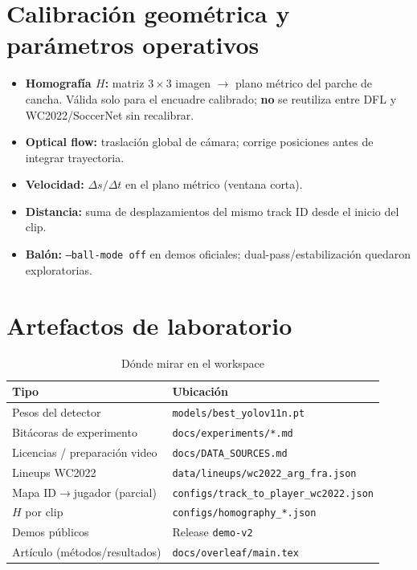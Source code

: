\documentclass[11pt,a4paper]{article}
\begin{document}
\section{Calibración geométrica y parámetros operativos}
\label{sec:geo}

\begin{itemize}[leftmargin=*,itemsep=3pt]
  \item \textbf{Homografía $H$:} matriz $3{\times}3$ imagen $\rightarrow$ plano métrico del parche de cancha. Válida solo para el encuadre calibrado; \textbf{no} se reutiliza entre DFL y WC2022/SoccerNet sin recalibrar.
  \item \textbf{Optical flow:} traslación global de cámara; corrige posiciones antes de integrar trayectoria.
  \item \textbf{Velocidad:} $\Delta s / \Delta t$ en el plano métrico (ventana corta).
  \item \textbf{Distancia:} suma de desplazamientos del mismo track ID desde el inicio del clip.
  \item \textbf{Balón:} \texttt{--ball-mode off} en demos oficiales; dual-pass/estabilización quedaron exploratorias.
\end{itemize}

\section{Artefactos de laboratorio}
\label{sec:artefactos}

\begin{table}[ht]
\centering
\caption{Dónde mirar en el workspace}
\label{tab:artefactos}
\begin{tabular}{@{}lp{9cm}@{}}
\toprule
\textbf{Tipo} & \textbf{Ubicación} \\
\midrule
Pesos del detector & \texttt{models/best\_yolov11n.pt} \\
Bitácoras de experimento & \texttt{docs/experiments/*.md} \\
Licencias / preparación video & \texttt{docs/DATA\_SOURCES.md} \\
Lineups WC2022 & \texttt{data/lineups/wc2022\_arg\_fra.json} \\
Mapa ID$\rightarrow$jugador (parcial) & \texttt{configs/track\_to\_player\_wc2022.json} \\
$H$ por clip & \texttt{configs/homography\_*.json} \\
Demos públicos & Release \texttt{demo-v2} \\
Artículo (métodos/resultados) & \texttt{docs/overleaf/main.tex} \\
\bottomrule
\end{tabular}
\end{table}
\end{document}
